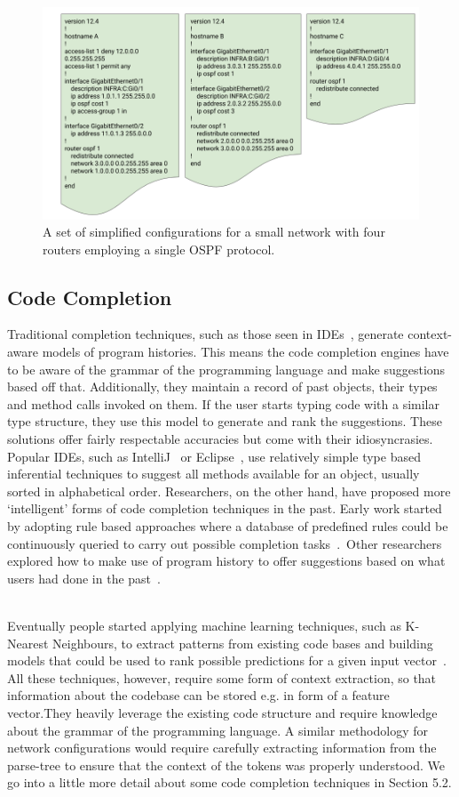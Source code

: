 \begin{figure}[H]
	\centering
	\includegraphics[width=5in]{configs-redone.png}
	\caption{A set of simplified configurations for a small network with four routers employing a single OSPF protocol.}
\end{figure}

\subsection{Code Completion}

Traditional completion techniques, such as those seen in IDEs~\cite{intelliJ-completion}, generate context-aware models of program histories.
This means the code completion engines have to be aware of the grammar of the programming language and make suggestions based off that. Additionally, they maintain a record of past objects, their types and method calls invoked on them. If the user starts typing code with a similar type structure, they use this model to generate and rank the suggestions. These solutions offer fairly respectable accuracies but come with their idiosyncrasies. Popular IDEs, such as IntelliJ~\cite{intelliJ} or Eclipse~\cite{eclipse}, use relatively simple type based inferential techniques to suggest all methods available for an object, usually sorted in alphabetical order. Researchers, on the other hand, have proposed more ‘intelligent’ forms of code completion techniques in the past. Early work started by adopting rule based approaches where a database of predefined rules could be continuously queried to carry out possible completion tasks~\cite{kaiser}.  Other researchers explored how to make use of program history to offer suggestions based on what users had done in the past~\cite{robbes}.\\  

Eventually people started applying machine learning techniques, such as K-Nearest Neighbours, to extract patterns from existing code bases and building models that could be used to rank possible predictions for a given input vector~\cite{bruch}. All these techniques, however, require some form of context extraction, so that information about the codebase can be stored e.g. in form of a feature vector.They heavily leverage the existing code structure and require knowledge about the grammar of the programming language. A similar methodology for network configurations would require carefully extracting information from the parse-tree to ensure that the context of the tokens was properly understood. We go into a little more detail about some code completion techniques in Section 5.2.

